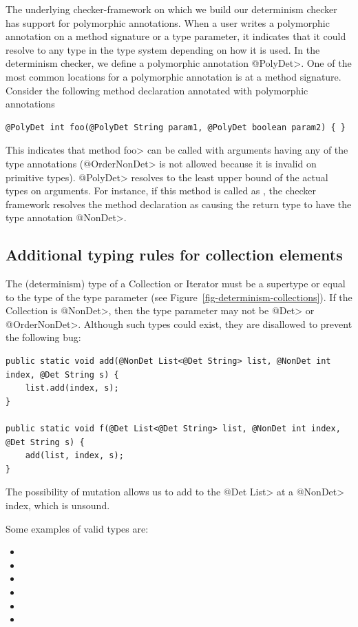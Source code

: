The underlying checker-framework on which we build our determinism checker has support for
polymorphic annotations. When a user writes a polymorphic annotation on a method signature or a type parameter,
it indicates that it could resolve to any type in the type system depending on how it is used.
In the determinism checker, we define a polymorphic annotation \<@PolyDet>.
One of the most common locations for a polymorphic annotation is at a method signature.
Consider the following method declaration annotated with polymorphic annotations
\begin{verbatim}
@PolyDet int foo(@PolyDet String param1, @PolyDet boolean param2) { }
\end{verbatim}
This indicates that method \<foo> can be called with arguments having any of the  type annotations 
(\<@OrderNonDet> is not allowed because it is invalid on primitive types). \<@PolyDet> resolves to the least upper bound of
the actual types on arguments. For instance, if this method is called as , the 
checker framework resolves the method declaration as 
causing the return type to have the type annotation \<@NonDet>.


\subsection{Additional typing rules for collection elements}
The (determinism) type of a Collection or Iterator must be a supertype or equal to
the type of the type parameter (see Figure~\ref{fig-determinism-collections}).
If the Collection is \<@NonDet>, then the type parameter may not be
\<@Det> or \<@OrderNonDet>. Although such types could exist, they are
disallowed to prevent the following bug:

\begin{verbatim}
public static void add(@NonDet List<@Det String> list, @NonDet int index, @Det String s) {
    list.add(index, s);
}

public static void f(@Det List<@Det String> list, @NonDet int index, @Det String s) {
    add(list, index, s);
}
\end{verbatim}

The possibility of mutation allows us to add to the \<@Det List> at a
\<@NonDet> index, which is unsound.

Some examples of valid types are:
\begin{itemize}
    \item {}
    \item {}
    \item {}
    \item {}
    \item {}
    \item {}
\end{itemize}

